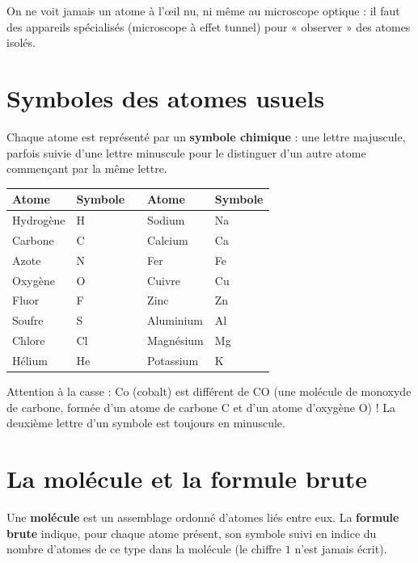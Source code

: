 \begin{remarque}
On ne voit jamais un atome à l'œil nu, ni même au microscope optique : il faut des
appareils spécialisés (microscope à effet tunnel) pour « observer » des atomes isolés.
\end{remarque}

\section{Symboles des atomes usuels}

\begin{propriete}
Chaque atome est représenté par un \textbf{symbole chimique} : une lettre majuscule, parfois
suivie d'une lettre minuscule pour le distinguer d'un autre atome commençant par la même
lettre.
\end{propriete}

\begin{center}
\small
\begin{tabular}{llcll}
\toprule
Atome & Symbole & \quad & Atome & Symbole \\
\midrule
Hydrogène & H & & Sodium & Na \\
Carbone & C & & Calcium & Ca \\
Azote & N & & Fer & Fe \\
Oxygène & O & & Cuivre & Cu \\
Fluor & F & & Zinc & Zn \\
Soufre & S & & Aluminium & Al \\
Chlore & Cl & & Magnésium & Mg \\
Hélium & He & & Potassium & K \\
\bottomrule
\end{tabular}
\end{center}

\begin{remarque}
Attention à la casse : $\mathrm{Co}$ (cobalt) est différent de $\mathrm{CO}$ (une molécule
de monoxyde de carbone, formée d'un atome de carbone $\mathrm{C}$ et d'un atome d'oxygène
$\mathrm{O}$) ! La deuxième lettre d'un symbole est toujours en minuscule.
\end{remarque}

\section{La molécule et la formule brute}

\begin{definition}
Une \textbf{molécule} est un assemblage ordonné d'atomes liés entre eux. La \textbf{formule
brute} indique, pour chaque atome présent, son symbole suivi en indice du nombre
d'atomes de ce type dans la molécule (le chiffre $1$ n'est jamais écrit).
\end{definition}

